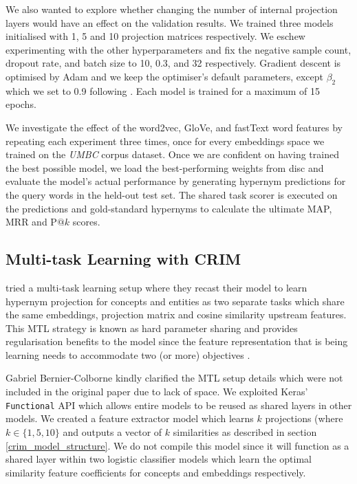 We also wanted to explore whether changing the number of internal projection layers would have an effect on the validation results.  We trained three models initialised with 1, 5 and 10 projection matrices respectively.  We eschew experimenting with the other hyperparameters and fix the negative sample count, dropout rate, and batch size to 10, 0.3, and 32 respectively.  Gradient descent is optimised by Adam \citep{kingma2014adam} and we keep the optimiser's default parameters, except $\beta_2$ which we set to 0.9 following \citep{bernier2018crim}.  Each model is trained for a maximum of 15 epochs.

We investigate the effect of the word2vec, GloVe, and fastText word features by repeating each experiment three times, once for every embeddings space we trained on the \textit{UMBC} corpus dataset.  Once we are confident on having trained the best possible model, we load the best-performing weights from disc and  evaluate the model's actual performance by generating hypernym predictions for the query words in the held-out test set.  The shared task scorer is executed on the predictions and gold-standard hypernyms to calculate the ultimate \ac{MAP}, \ac{MRR} and P$@k$ scores.

\subsection{Multi-task Learning with CRIM}
\citet{bernier2018crim} tried a multi-task learning setup where they recast their model to learn hypernym projection for concepts and entities as two separate tasks which share the same embeddings, projection matrix and cosine similarity upstream features.  This \ac{MTL} strategy is known as hard parameter sharing and provides regularisation benefits to the model since the feature representation that is being learning needs to accommodate two (or more) objectives \citep{ruder2017overview}.

Gabriel Bernier-Colborne kindly clarified the \ac{MTL} setup details which were not included in the original paper due to lack of space.  We exploited Keras' \texttt{Functional} API which allows entire models to be reused as shared layers in other models.  We created a feature extractor model which learns $k$ projections (where $k \in \{1, 5, 10\}$  and outputs a vector of $k$ similarities as described in section \ref{crim_model_structure}.  We do not compile this model since it will function as a shared layer within two logistic classifier models which learn the optimal similarity feature coefficients for concepts and embeddings respectively.

